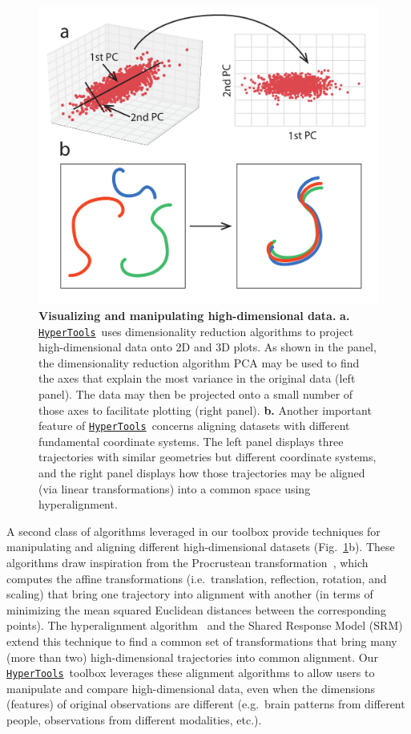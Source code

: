 \documentclass[12pt,letterpaper]{article}
\newcommand{\hypertools}{\href{https://github.com/ContextLab/hypertools}{\texttt{HyperTools}}}
\begin{document}
\begin{figure}[tbp]
\centering
\includegraphics[width=.75\textwidth]{methods}
\caption{\textbf{Visualizing and manipulating high-dimensional data.}  \textbf{a.}  \hypertools~uses dimensionality reduction algorithms to project high-dimensional data onto 2D and 3D plots.  As shown in the panel, the dimensionality reduction algorithm PCA may be used to find the axes that explain the most variance in the original data (left panel).  The data may then be projected onto a small number of those axes to facilitate plotting (right panel).  \textbf{b.} Another important feature of \hypertools~concerns aligning datasets with different fundamental coordinate systems.  The left panel displays three trajectories with similar geometries but different coordinate systems, and the right panel displays how those trajectories may be aligned (via linear transformations) into a common space using hyperalignment.}
\label{fig:methods}
\end{figure}
  
A second class of algorithms leveraged in our toolbox provide techniques for manipulating and aligning different high-dimensional datasets (Fig.~\ref{fig:methods}b).  These algorithms draw inspiration from the Procrustean transformation~\cite{Scho66}, which computes the affine transformations (i.e.\ translation, reflection, rotation, and scaling) that bring one trajectory into alignment with another (in terms of minimizing the mean squared Euclidean distances between the corresponding points).  The hyperalignment algorithm~\cite{HaxbEtal11} and the Shared Response Model (SRM)~\cite{ChenEtal15} extend this technique to find a common set of transformations that bring many (more than two) high-dimensional trajectories into common alignment.  Our \hypertools~toolbox leverages these alignment algorithms to allow users to manipulate and compare high-dimensional data, even when the dimensions (features) of original observations are different (e.g.\ brain patterns from different people, observations from different modalities, etc.).
\end{document}
